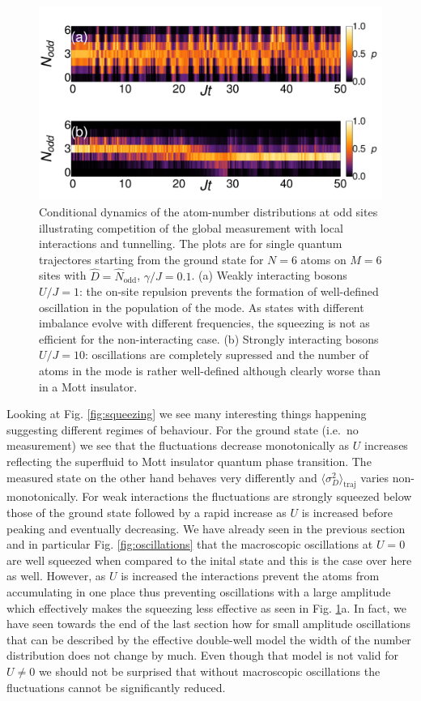 \begin{figure}[htbp!]
  \centering
  \includegraphics[width=\textwidth]{panel_U}
  \caption[Trajectories in the presence of Interactions]{Conditional
    dynamics of the atom-number distributions at odd sites
    illustrating competition of the global measurement with local
    interactions and tunnelling. The plots are for single quantum
    trajectores starting from the ground state for $N = 6$ atoms on
    $M = 6$ sites with $\hat{D} = \hat{N}_\mathrm{odd}$,
    $\gamma/J = 0.1$. (a) Weakly interacting bosons $U/J = 1$: the
    on-site repulsion prevents the formation of well-defined
    oscillation in the population of the mode. As states with
    different imbalance evolve with different frequencies, the
    squeezing is not as efficient for the non-interacting case. (b)
    Strongly interacting bosons $U/J = 10$: oscillations are
    completely supressed and the number of atoms in the mode is rather
    well-defined although clearly worse than in a Mott insulator.}
  \label{fig:Utraj}
\end{figure}

Looking at Fig. \ref{fig:squeezing} we see many interesting things
happening suggesting different regimes of behaviour. For the ground
state (i.e.~no measurement) we see that the fluctuations decrease
monotonically as $U$ increases reflecting the superfluid to Mott
insulator quantum phase transition. The measured state on the other
hand behaves very differently and
$\langle \sigma^2_D \rangle_\mathrm{traj}$ varies
non-monotonically. For weak interactions the fluctuations are strongly
squeezed below those of the ground state followed by a rapid increase
as $U$ is increased before peaking and eventually decreasing. We have
already seen in the previous section and in particular
Fig. \ref{fig:oscillations} that the macroscopic oscillations at
$U = 0$ are well squeezed when compared to the inital state and this
is the case over here as well. However, as $U$ is increased the
interactions prevent the atoms from accumulating in one place thus
preventing oscillations with a large amplitude which effectively makes
the squeezing less effective as seen in Fig. \ref{fig:Utraj}a. In
fact, we have seen towards the end of the last section how for small
amplitude oscillations that can be described by the effective
double-well model the width of the number distribution does not change
by much. Even though that model is not valid for $U \ne 0$ we should
not be surprised that without macroscopic oscillations the
fluctuations cannot be significantly reduced.

